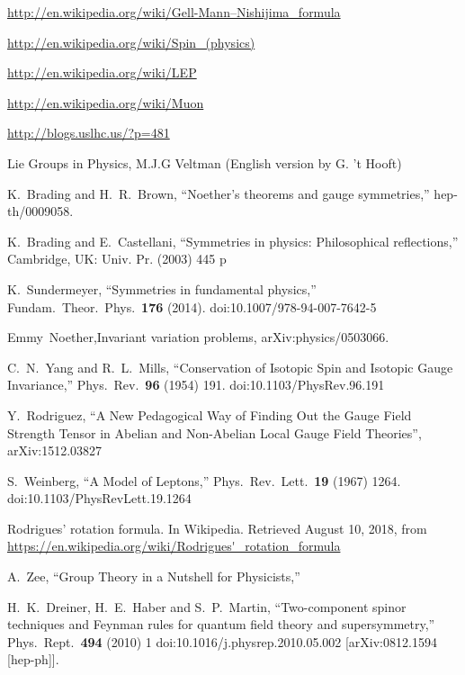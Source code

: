 \begin{thebibliography}{999}
\url{http://en.wikipedia.org/wiki/Gell-Mann–Nishijima_formula}

\url{http://en.wikipedia.org/wiki/Spin_(physics)}

\url{http://en.wikipedia.org/wiki/LEP}

\url{http://en.wikipedia.org/wiki/Muon}

\url{http://blogs.uslhc.us/?p=481}

 Lie Groups in Physics, M.J.G Veltman (English version by G. 't Hooft)

  K.~Brading and H.~R.~Brown,
  ``Noether's theorems and gauge symmetries,''
  hep-th/0009058.


  K.~Brading and E.~Castellani,
  ``Symmetries in physics: Philosophical reflections,''
  Cambridge, UK: Univ. Pr. (2003) 445 p

  K.~Sundermeyer,
  ``Symmetries in fundamental physics,''
  Fundam.\ Theor.\ Phys.\  {\bf 176} (2014).
  doi:10.1007/978-94-007-7642-5

 Emmy~Noether,Invariant variation problems, arXiv:physics/0503066.

  C.~N.~Yang and R.~L.~Mills,
  ``Conservation of Isotopic Spin and Isotopic Gauge Invariance,''
  Phys.\ Rev.\  {\bf 96} (1954) 191.
  doi:10.1103/PhysRev.96.191

Y.~Rodriguez, ``A New Pedagogical Way of Finding Out the Gauge Field Strength Tensor in Abelian and Non-Abelian Local Gauge Field Theories'', arXiv:1512.03827



  S.~Weinberg,
  ``A Model of Leptons,''
  Phys.\ Rev.\ Lett.\  {\bf 19} (1967) 1264.
  doi:10.1103/PhysRevLett.19.1264

 Rodrigues' rotation formula. In Wikipedia. Retrieved August 10, 2018, from \url{https://en.wikipedia.org/wiki/Rodrigues'_rotation_formula}


  A.~Zee,
  ``Group Theory in a Nutshell for Physicists,''

  H.~K.~Dreiner, H.~E.~Haber and S.~P.~Martin,
  ``Two-component spinor techniques and Feynman rules for quantum field theory and supersymmetry,''
  Phys.\ Rept.\  {\bf 494} (2010) 1
  doi:10.1016/j.physrep.2010.05.002
  [arXiv:0812.1594 [hep-ph]].



\end{thebibliography}
